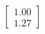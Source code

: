 \documentclass[preview]{standalone}
\begin{document}
\begin{align*}
\begin{bmatrix} 1.00 \\ 1.27 \end{bmatrix}
\end{align*}
\end{document}
